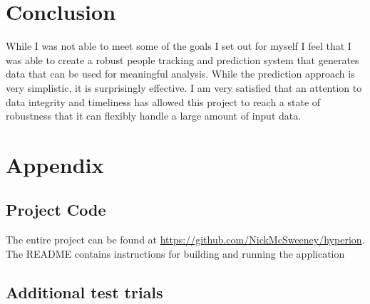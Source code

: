 \documentclass[10pt,a4paper]{article}
\begin{document}
\section{Conclusion}
While I was not able to meet some of the goals I set out for myself I feel that I was able to create a robust people tracking and prediction system that generates data that can be used for meaningful analysis. While the prediction approach is very simplistic, it is surprisingly effective. I am very satisfied that an attention to data integrity and timeliness has allowed this project to reach a state of robustness that it can flexibly handle a large amount of input data.

\section{Appendix}
\subsection{Project Code}
The entire project can be found at \url{https://github.com/NickMcSweeney/hyperion}. The README contains instructions for building and running the application

\subsection{Additional test trials}
\end{document}
